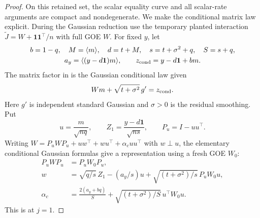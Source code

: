 \begin{proof}
On this retained set, the scalar equality curve and all scalar-rate arguments
are compact and nondegenerate. We make the conditional matrix law explicit.
During the Gaussian reduction use the temporary planted interaction
\(\widetilde J=W+\mathbf1\mathbf1^\top/n\) with full GOE \(W\).
For fixed \(y\), let
\[
 \begin{gathered}
 b=1-q,\quad M=\langle m\rangle,\quad d=t+M,\quad
 s=t+\sigma^2+q,\quad S=s+q,\\
 a_y=\langle(y-d\mathbf1)m\rangle,\qquad
 z_{\rm cond}=y-d\mathbf1+bm .
 \end{gathered}
\]
The matrix factor in \cite[Eq.~(5.8)]{AcceptedGap} is the Gaussian
conditional law given
\[
 Wm+\sqrt{t+\sigma^2}\,g'=z_{\rm cond}.
\]
Here \(g'\) is independent standard Gaussian and \(\sigma>0\) is the
residual smoothing. Put
\[
 u=\frac{m}{\sqrt{nq}},\qquad
 Z_1=\frac{y-d\mathbf1}{\sqrt{ns}},\qquad P_u=I-uu^\top .
\]
Writing \(W=P_uWP_u+uw^\top+wu^\top+\alpha_c uu^\top\) with \(w\perp u\), the elementary
conditional Gaussian formulas give a representation using a fresh GOE \(W_0\):
\[
 \begin{split}
 P_uWP_u&=P_uW_0P_u,\\
 w&=\sqrt{q/s}\,Z_1-(a_y/s)u+
           \sqrt{(t+\sigma^2)/s}\,P_uW_0u,\\
 \alpha_c&=\frac{2(a_y+bq)}S+
           \sqrt{(t+\sigma^2)/S}\,u^\top W_0u .
 \end{split}
\]
This is \cite[Eq.~(5.12)]{AcceptedGap} at \(j=1\).


\end{proof}

